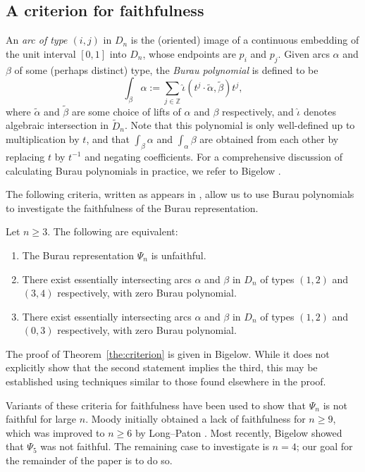 \subsection{A criterion for faithfulness}

An \emph{arc of type $(i,j)$} in $D_n$ is the (oriented) image of a continuous embedding of the unit interval $[0,1]$ into $D_n$, whose endpoints are $p_i$ and $p_j$. Given arcs $\alpha$ and $\beta$ of some (perhaps distinct) type, the \emph{Burau polynomial} \cite{LP93} is defined to be
\[ \int_{\beta} \alpha := \sum_{j \in \mathbb{Z}} \hat \iota (t^j \cdot \tilde \alpha , \tilde \beta) t^j ,\] where $\tilde \alpha$ and $\tilde \beta$ are some choice of lifts of $\alpha$ and $\beta$ respectively, and $\hat \iota$ denotes algebraic intersection in $\tilde D_n$. Note that this polynomial is only well-defined up to multiplication by $t$, and that $\int_{\beta} \alpha$ and $\int_{\alpha} \beta$ are obtained from each other by replacing $t$ by $t^{-1}$ and negating coefficients. For a comprehensive discussion of calculating Burau polynomials in practice, we refer to Bigelow \cite{Big99}.

The following criteria, written as appears in \cite{Big99}, allow us to use Burau polynomials to investigate the faithfulness of the Burau representation.

\begin{theorem} \label{the:criterion}Let $n \geq 3$. The following are equivalent:
\begin{enumerate}\item The Burau representation $\Psi_n$ is unfaithful.
\item There exist essentially intersecting arcs $\alpha$ and $\beta$ in $D_n$ of types $(1,2)$ and $(3,4)$ respectively, with zero Burau polynomial.
\item There exist essentially intersecting arcs $\alpha$ and $\beta$ in $D_n$ of types $(1,2)$ and $(0,3)$ respectively, with zero Burau polynomial. 
\end{enumerate}
\end{theorem}
The proof of Theorem~\ref{the:criterion} is given in Bigelow. While it does not explicitly show that the second statement implies the third, this may be established using techniques similar to those found elsewhere in the proof.

Variants of these criteria for faithfulness have been used to show that $\Psi_n$ is not faithful for large $n$. Moody \cite{Moo91} initially obtained a lack of faithfulness for $n \geq 9$, which was improved to $n \geq 6$ by Long--Paton \cite{LP93}. Most recently, Bigelow \cite{Big99} showed that $\Psi_5$ was not faithful. The remaining case to investigate is $n = 4$; our goal for the remainder of the paper is to do so.

